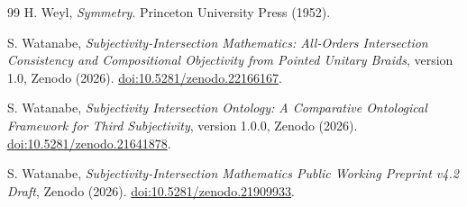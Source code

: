 \documentclass[11pt]{article}
\theoremstyle{definition}
\theoremstyle{remark}
\begin{document}
\begin{thebibliography}{99}
H. Weyl, \emph{Symmetry}. Princeton University Press (1952).

S. Watanabe, \emph{Subjectivity-Intersection Mathematics: All-Orders Intersection Consistency and Compositional Objectivity from Pointed Unitary Braids}, version 1.0, Zenodo (2026). \href{https://doi.org/10.5281/zenodo.22166167}{doi:10.5281/zenodo.22166167}.

S. Watanabe, \emph{Subjectivity Intersection Ontology: A Comparative Ontological Framework for Third Subjectivity}, version 1.0.0, Zenodo (2026). \href{https://doi.org/10.5281/zenodo.21641878}{doi:10.5281/zenodo.21641878}.

S. Watanabe, \emph{Subjectivity-Intersection Mathematics Public Working Preprint v4.2 Draft}, Zenodo (2026). \href{https://doi.org/10.5281/zenodo.21909933}{doi:10.5281/zenodo.21909933}.

\end{thebibliography}
\end{document}
